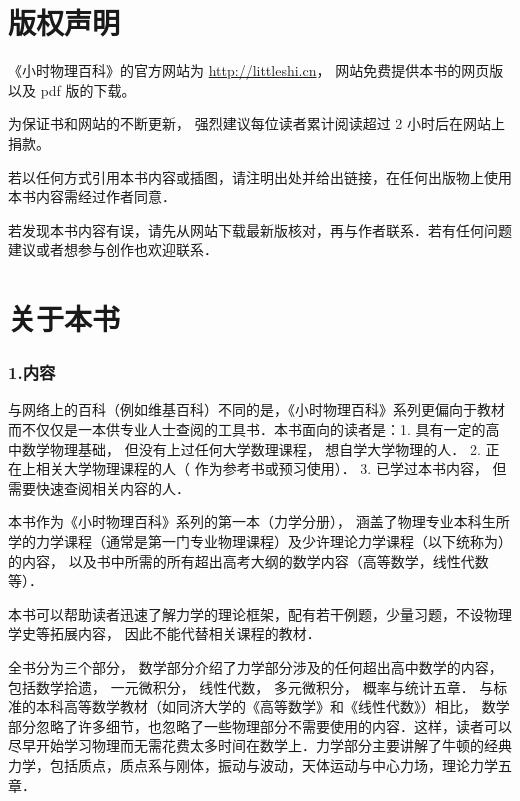 
\chapter*{版权声明}

《小时物理百科》的官方网站为 \href{http://littleshi.cn}{http://littleshi.cn}， 网站免费提供本书的网页版以及 pdf 版的下载。

为保证书和网站的不断更新， 强烈建议每位读者累计阅读超过 2 小时后在网站上捐款。

若以任何方式引用本书内容或插图，请注明出处并给出链接，在任何出版物上使用本书内容需经过作者同意．

若发现本书内容有误，请先从网站下载最新版核对，再与作者联系．若有任何问题建议或者想参与创作也欢迎联系．

\chapter*{关于本书}

\subsection{1.内容}

与网络上的百科（例如维基百科）不同的是，《小时物理百科》系列更偏向于教材而不仅仅是一本供专业人士查阅的工具书．本书面向的读者是：1. 具有一定的高中数学物理基础， 但没有上过任何大学数理课程， 想自学大学物理的人． 2. 正在上相关大学物理课程的人（ 作为参考书或预习使用）． 3. 已学过本书内容， 但需要快速查阅相关内容的人．

本书作为《小时物理百科》系列的第一本（力学分册）， 涵盖了物理专业本科生所学的力学课程（通常是第一门专业物理课程）及少许理论力学课程（以下统称为）的内容， 以及书中所需的所有超出高考大纲的数学内容（高等数学，线性代数等）． 

本书可以帮助读者迅速了解力学的理论框架，配有若干例题，少量习题，不设物理学史等拓展内容， 因此不能代替相关课程的教材．

全书分为三个部分， 数学部分介绍了力学部分涉及的任何超出高中数学的内容， 包括数学拾遗， 一元微积分， 线性代数， 多元微积分， 概率与统计五章． 与标准的本科高等数学教材（如同济大学的《高等数学》和《线性代数》）相比， 数学部分忽略了许多细节，也忽略了一些物理部分不需要使用的内容．这样，读者可以尽早开始学习物理而无需花费太多时间在数学上．力学部分主要讲解了牛顿的经典力学，包括质点，质点系与刚体，振动与波动，天体运动与中心力场，理论力学五章．

